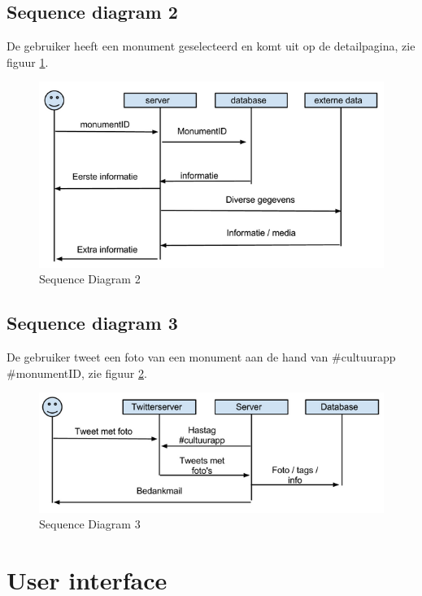 \documentclass[a4paper,10pt]{article}
\begin{document}
			\subsection{Sequence diagram 2}
			De gebruiker heeft een monument geselecteerd en komt uit op de detailpagina, zie figuur \ref{sequence2}.
			\begin{figure}[ht!]
				\centering
				\includegraphics[width=\textwidth]{sequence2.png}
				\caption{Sequence Diagram 2 \label{sequence2}}
			\end{figure}
			\subsection{Sequence diagram 3}
			De gebruiker tweet een foto van een monument aan de hand van \#cultuurapp \#monumentID, zie figuur \ref{sequence3}.
			\begin{figure}[ht!]
				\centering
				\includegraphics[width=\textwidth]{sequence3.png}
				\caption{Sequence Diagram 3 \label{sequence3}}
			\end{figure}
		
		\clearpage			
		\section{User interface}
\end{document}
